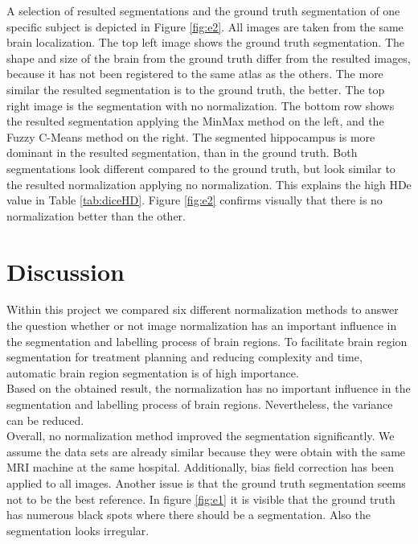 \documentclass[article]{IEEEtran}
\begin{document}
\begin{multicols}{2}

	A selection of resulted segmentations and the ground truth segmentation of one specific subject is depicted in Figure \ref{fig:e2}.
	All images are taken from the same brain localization.
	The top left image shows the ground truth segmentation. 
	The shape and size of the brain from the ground truth differ from the resulted images, because it has not been registered to the same atlas as the others.
	The more similar the resulted segmentation is to the ground truth, the better.
	The top right image is the segmentation with no normalization.
	The bottom row shows the resulted segmentation applying the MinMax method on the left, and the Fuzzy C-Means method on the right. 
	The segmented hippocampus is more dominant in the resulted segmentation, than in the ground truth.
	Both segmentations look different compared to the ground truth, but look similar to the resulted normalization applying no normalization. 
	This explains the high HDe value in Table \ref{tab:diceHD}. 
	Figure \ref{fig:e2} confirms visually that there is no normalization better than the other.
	




\section{Discussion}
	Within this project we compared six different normalization methods to answer the question whether or not image normalization has an important influence in the segmentation and labelling process of brain regions.
	To facilitate brain region segmentation for treatment planning and reducing complexity and time, automatic brain region segmentation is of high importance. \\
	
	Based on the obtained result, the normalization has no important influence in the segmentation and labelling process of brain regions. 
	Nevertheless, the variance can be reduced. \\
	
	Overall, no normalization method improved the segmentation significantly.
	We assume the data sets are already similar because they were obtain with the same MRI machine at the same hospital. 
	Additionally, bias field correction has been applied to all images. 
	Another issue is that the ground truth segmentation seems not to be the best reference. 
	In figure \ref{fig:e1} it is visible that the ground truth has numerous black spots where there should be a segmentation. Also the segmentation looks irregular.\\
	

\end{multicols}
\end{document}
